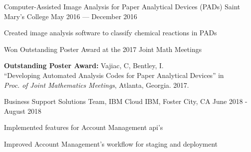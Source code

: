 \begin{cventries}
{  }
  {Computer-Assisted Image Analysis for Paper Analytical Devices (PADs)}
  {Saint Mary's College}
  {May 2016 --- December 2016}
  {\begin{cvitems}
    \item {Created image analysis software to classify chemical reactions in PADs}
    \item {Won Outstanding Poster Award at the 2017 Joint Math Meetings}
    \item \textbf{ Outstanding Poster Award:}
      Vajiac, C, Bentley, I. \\
      ``Developing Automated Analysis Codes for Paper Analytical Devices'' in \\
    \textit{Proc. of Joint Mathematics Meetings}, Atlanta, Georgia. 2017.
    \end{cvitems}
  }
\end{cventries}

\begin{cventries}
  {Business Support Solutions Team, IBM Cloud}
  {IBM, Foster City, CA}
  {June 2018 - August 2018}
  {\begin{cvitems}
  \item Implemented features for Account Management api's
  \item Improved Account Management's workflow for staging and deployment
  \end{cvitems}}
\end{cventries}
